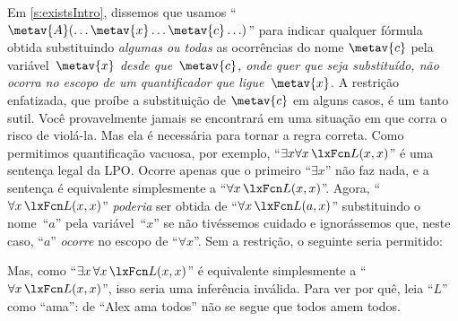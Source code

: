 Em \cref{s:existsIntro}, dissemos que usamos \textquotedblleft $\metav{A}(\ldots
\metav{x} \ldots \metav{c}\ldots)$\textquotedblright{} para indicar qualquer fórmula obtida
substituindo \emph{algumas ou todas} as ocorrências do nome $\metav{c}$
pela variável~$\metav{x}$ \emph{desde que~$\metav{c}$,
onde quer que seja substituído, não ocorra no escopo de um quantificador
que ligue~$\metav{x}$}. A restrição enfatizada, que proíbe
a substituição de $\metav{c}$ em alguns casos, é um tanto sutil. Você
provavelmente jamais se encontrará em uma situação em que corra o
risco de violá-la. Mas ela é necessária para tornar a regra correta.
Como permitimos quantificação vacuosa, por exemplo, \textquotedblleft $\exists
x\forall x\,\atom{L}{x,x}$\textquotedblright{} é uma sentença legal da LPO. Ocorre apenas que o primeiro
\textquotedblleft $\exists x$\textquotedblright{} não faz nada, e a sentença
é equivalente simplesmente a \textquotedblleft $\forall x\,\atom{L}{x,x}$\textquotedblright{}. Agora, \textquotedblleft $\forall
x\,\atom{L}{x,x}$\textquotedblright{} \emph{poderia} ser obtida de \textquotedblleft $\forall
x\,\atom{L}{a,x}$\textquotedblright{} substituindo o nome~\textquotedblleft $a$\textquotedblright{} pela variável~\textquotedblleft $x$\textquotedblright{}
se não tivéssemos cuidado e ignorássemos que, neste caso, \textquotedblleft $a$\textquotedblright{} \emph{ocorre}
no escopo de \textquotedblleft $\forall x$\textquotedblright{}. Sem a restrição, o seguinte seria permitido:

\begin{fitchproof}
		\PR
		\ifHTMLtarget
	\else
	\fi\end{fitchproof}
Mas, como \textquotedblleft $\exists x\, \forall x\, \atom{L}{x,x}$\textquotedblright{} é equivalente
simplesmente a \textquotedblleft $\forall x\, \atom{L}{x,x}$\textquotedblright{}, isso seria uma inferência inválida.
Para ver por quê, leia \textquotedblleft $L$\textquotedblright{} como \textquotedblleft ama\textquotedblright{}: de
\textquotedblleft Alex ama todos\textquotedblright{} não se segue que todos amem todos.

